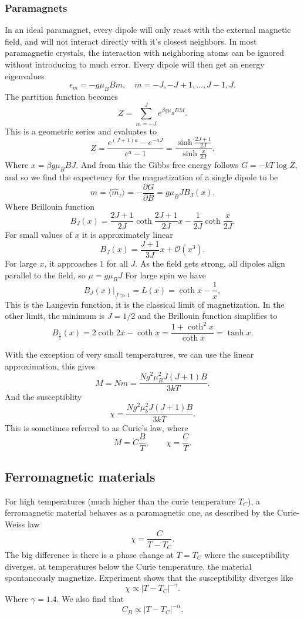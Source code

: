 \documentclass[a4paper, 11pt, notitlepage, english]{article}
\newcommand{\op}[1]{\hat{#1}}
\newcommand{\eps}{\epsilon}
\newcommand{\p}{\partial}
\begin{document}
\subsubsection*{Paramagnets}

In an ideal paramagnet, every dipole will only react with the external magnetic field, and will not interact directly with it's closest neighbors. In most paramagnetic crystals, the interaction with neighboring atoms can be ignored without introducing to much error. Every dipole will then get an energy eigenvalues
$$\eps_m = -g\mu_B B m, \quad m=-J, -J+1, \ldots, J-1, J.$$
The partition function becomes
$$Z = \sum_{m=-J}^J e^{\beta g\mu_B B M}.$$
This is a geometric series and evaluates to
$$Z = \frac{e^{(J+1)a} - e^{-aJ}}{e^a - 1} = \frac{\sinh \frac{2J+1}{2J}}{\sinh \frac{x}{2J}}.$$
Where $x = \beta g \mu_B B J$. And from this the Gibbs free energy follows $G = -kT \log Z$, and so we find the expectency for the magnetization of a single dipole to be
$$m = \langle \op{m}_z \rangle = -\frac{\p G}{\p B} = g\mu_B J B_J(x).$$
Where Brillouin function
$$B_J(x) = \frac{2J+1}{2J}\coth \frac{2J+1}{2J} x - \frac{1}{2J}\coth \frac{x}{2J}.$$
For small values of $x$ it is approximately linear
$$B_J(x) = \frac{J+1}{3J}x + \mathcal{O}(x^3).$$
For large $x$, it approaches $1$ for all $J$. As the field gets strong, all dipoles align parallel to the field, so $\mu = g\mu_B J$
For large spin we have
$$B_J(x)\big|_{J\gg1} = L(x) = \coth x - \frac{1}{x},$$
This is the Langevin function, it is the classical limit of magnetization.
In the other limit, the minimum is $J=1/2$ and the Brillouin function simplifies to
$$B_{\frac{1}{2}}(x) = 2\coth 2x - \coth x = \frac{1 + \coth^2 x}{\coth x} = \tanh x.$$

With the exception of very small temperatures, we can use the linear approximation, this gives
$$M = Nm = \frac{Ng^2\mu_B^2J(J+1)B}{3kT}.$$
And the susceptiblity
$$\chi = \frac{Ng^2\mu_b^2J(J+1)B}{3kT}.$$
This is sometimes referred to as Curie's law, where 
$$M = C \frac{B}{T}, \qquad \chi = \frac{C}{T}.$$

\subsection*{Ferromagnetic materials}
For high temperatures (much higher than the curie temperature $T_C$), a ferromagnetic material behaves as a paramagnetic one, as described by the Curie-Weiss law
$$\chi = \frac{C}{T-T_C}.$$
The big difference is there is a phase change at $T = T_C$ where the susceptibility diverges, at temperatures below the Curie temperature, the material spontaneously magnetize. Experiment shows that the susceptibility diverges like
$$\chi \propto |T-T_C|^{-\gamma}.$$
Where $\gamma = 1.4$. We also find that
$$C_B \propto |T-T_C|^{-\alpha}.$$
\end{document}
